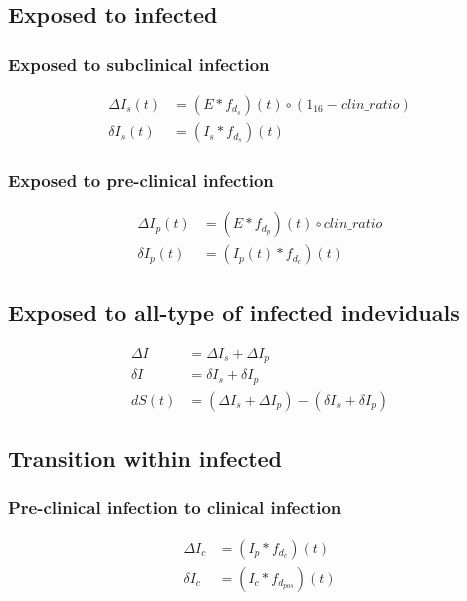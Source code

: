 \documentclass[12pt]{article}
\newcommand{\vect}[1]{\left( #1 \right)}
\begin{document}
\subsection*{Exposed to infected}
\subsubsection*{Exposed to subclinical infection}
\begin{align*}
    \Delta I_s(t) &= \vect{E * f_{d_s}  }(t) \circ \vect{1_{16} - clin\_ratio} \\
    \delta I_s(t) &= \vect{I_s * f_{d_{s}}} (t)
\end{align*}

\subsubsection*{Exposed to pre-clinical infection}
\begin{align*}
    \Delta I_p(t) &= \vect{E * f_{d_p} }(t) \circ  clin\_ratio \\
    \delta I_p(t) &= \vect{I_p(t) * f_{d_{c}}} (t)
\end{align*}

\subsection*{Exposed to all-type of infected indeviduals}
\begin{align*}
    \Delta I &= \Delta I_s + \Delta I_p\\
    \delta I &= \delta I_s + \delta I_p\\
    d S(t) &= \vect{\Delta I_s + \Delta I_p } - \vect{\delta I_s + \delta I_p}
\end{align*}

\subsection*{Transition within infected}
\subsubsection*{Pre-clinical infection to clinical infection}
\begin{align*}
    \Delta I_c &= \vect{I_p * f_{d_c}} (t)\\
    \delta I_c &= \vect{I_c * f_{d_{pos}}} (t)
\end{align*}


\end{document}
